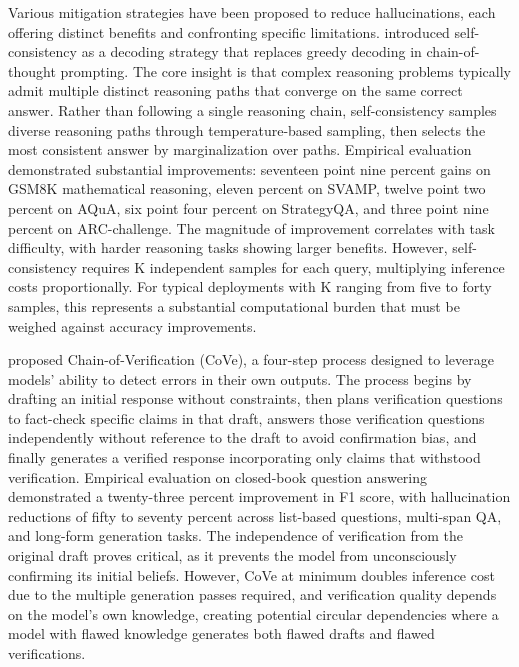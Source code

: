 \documentclass[11pt,letterpaper]{article}
\begin{document}
Various mitigation strategies have been proposed to reduce hallucinations, each offering distinct benefits and confronting specific limitations. \cite{wang2023selfconsistency} introduced self-consistency as a decoding strategy that replaces greedy decoding in chain-of-thought prompting. The core insight is that complex reasoning problems typically admit multiple distinct reasoning paths that converge on the same correct answer. Rather than following a single reasoning chain, self-consistency samples diverse reasoning paths through temperature-based sampling, then selects the most consistent answer by marginalization over paths. Empirical evaluation demonstrated substantial improvements: seventeen point nine percent gains on GSM8K mathematical reasoning, eleven percent on SVAMP, twelve point two percent on AQuA, six point four percent on StrategyQA, and three point nine percent on ARC-challenge. The magnitude of improvement correlates with task difficulty, with harder reasoning tasks showing larger benefits. However, self-consistency requires K independent samples for each query, multiplying inference costs proportionally. For typical deployments with K ranging from five to forty samples, this represents a substantial computational burden that must be weighed against accuracy improvements.

\cite{dhuliawala2023chain} proposed Chain-of-Verification (CoVe), a four-step process designed to leverage models' ability to detect errors in their own outputs. The process begins by drafting an initial response without constraints, then plans verification questions to fact-check specific claims in that draft, answers those verification questions independently without reference to the draft to avoid confirmation bias, and finally generates a verified response incorporating only claims that withstood verification. Empirical evaluation on closed-book question answering demonstrated a twenty-three percent improvement in F1 score, with hallucination reductions of fifty to seventy percent across list-based questions, multi-span QA, and long-form generation tasks. The independence of verification from the original draft proves critical, as it prevents the model from unconsciously confirming its initial beliefs. However, CoVe at minimum doubles inference cost due to the multiple generation passes required, and verification quality depends on the model's own knowledge, creating potential circular dependencies where a model with flawed knowledge generates both flawed drafts and flawed verifications.
\end{document}

